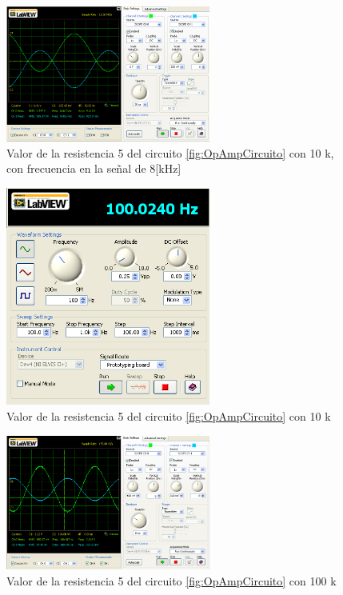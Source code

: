 \documentclass[]{article}
\begin{document}
\begin{figure}[h!]
	\centering
	\includegraphics[width=0.6\textwidth]{Imagenes/r5es10kfrecu8Kprac4.png}
	\caption{Valor de la resistencia 5 del circuito \ref{fig:OpAmpCircuito} con 10 k, con frecuencia en la señal de 8[kHz]}
	\label{fig:8K}
\end{figure}

\begin{figure}[h!]
	\centering
	\includegraphics[width=0.6\textwidth]{Imagenes/r5es10kprac4.png}
	\caption{Valor de la resistencia 5 del circuito \ref{fig:OpAmpCircuito} con 10 k}
	\label{fig:noFrec}
\end{figure}

\begin{figure}[h!]
	\centering
	\includegraphics[width=0.6\textwidth]{Imagenes/r5es100kprac4.png}
	\caption{Valor de la resistencia 5 del circuito \ref{fig:OpAmpCircuito} con 100 k}
	\label{fig:100kres}
\end{figure}
\end{document}

